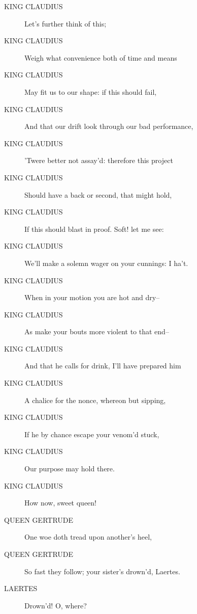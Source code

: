 \documentclass{article}
\begin{document}
\begin{description}
            
\item[KING CLAUDIUS] Let's further think of this;
\item[KING CLAUDIUS] Weigh what convenience both of time and means
\item[KING CLAUDIUS] May fit us to our shape: if this should fail,
\item[KING CLAUDIUS] And that our drift look through our bad performance,
\item[KING CLAUDIUS] 'Twere better not assay'd: therefore this project
\item[KING CLAUDIUS] Should have a back or second, that might hold,
\item[KING CLAUDIUS] If this should blast in proof. Soft! let me see:
\item[KING CLAUDIUS] We'll make a solemn wager on your cunnings: I ha't.
\item[KING CLAUDIUS] When in your motion you are hot and dry--
\item[KING CLAUDIUS] As make your bouts more violent to that end--
\item[KING CLAUDIUS] And that he calls for drink, I'll have prepared him
\item[KING CLAUDIUS] A chalice for the nonce, whereon but sipping,
\item[KING CLAUDIUS] If he by chance escape your venom'd stuck,
\item[KING CLAUDIUS] Our purpose may hold there.
\item[KING CLAUDIUS] How now, sweet queen!
\end{description}
          
\begin{description}
            
\item[QUEEN GERTRUDE] One woe doth tread upon another's heel,
\item[QUEEN GERTRUDE] So fast they follow; your sister's drown'd, Laertes.
\end{description}
          
\begin{description}
            
\item[LAERTES] Drown'd! O, where?
\end{description}
          
\end{document}
